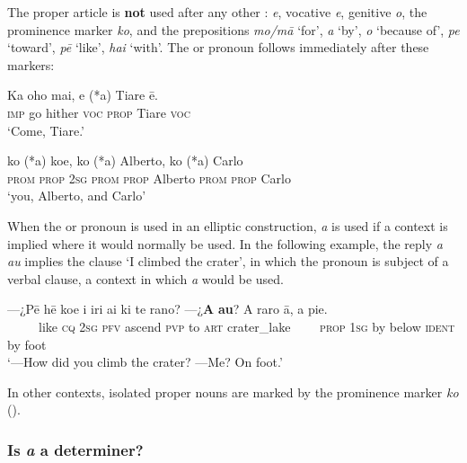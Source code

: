 The proper article is \textbf{not} used after any other :  \textit{e}, vocative \textit{e}, genitive \textit{o}, the prominence marker \textit{ko}, and the prepositions \textit{mo/mā} ‘for’, \textit{a} ‘by’, \textit{{\ꞌ}o} ‘because of’, \textit{pe} ‘toward’, \textit{pē} ‘like’, \textit{hai} ‘with’. The  or pronoun follows immediately after these markers:

\ea\label{ex:5.193}
\gll Ka oho mai, e (*a) Tiare ē. \\
\textsc{imp} go hither \textsc{voc} \textsc{prop} Tiare \textsc{voc} \\

\glt 
‘Come, Tiare.’ \textstyleExampleref{[R152.035]} 
\z

\ea\label{ex:5.194}
\gll ko (*a) koe, ko (*a) Alberto, ko (*a) Carlo \\
\textsc{prom} \textsc{prop} \textsc{2sg} \textsc{prom} \textsc{prop} Alberto \textsc{prom} \textsc{prop} Carlo \\

\glt 
‘you, Alberto, and Carlo’ \textstyleExampleref{[R103.026]} 
\z

When the  or pronoun is used in an elliptic construction, \textit{a} is used if a context is implied where it would normally be used. In the following example, the reply \textit{a au} implies the clause ‘I climbed the crater’, in which the pronoun is subject of a verbal clause, a context in which \textit{a} would be used. 

\ea\label{ex:5.195}
\gll —¿Pē hē koe i iri ai ki te rano? —¿\textbf{A} \textbf{au}? A raro {\ꞌ}ā, a pie. \\
~~~~~like \textsc{cq} \textsc{2sg} \textsc{pfv} ascend \textsc{pvp} to \textsc{art} crater\_lake ~~~~\textsc{prop} \textsc{1sg} by below \textsc{ident} by foot \\

\glt
‘—How did you climb the crater? —Me? On foot.’ \textstyleExampleref{[R623.015–017]}
\z

In other contexts, isolated proper nouns are marked by the prominence marker \textit{ko} ().

\subsubsection[Is a a determiner?]{Is \textit{a} a determiner?}\label{sec:5.13.2.2}

